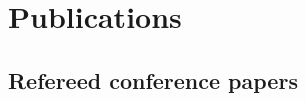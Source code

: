 
\section{Publications}

\subsection{Refereed conference papers}

\nocite{Rivera-Rubio2010}
\nocite{Madera2009}
\nocite{Rivera-Rubio2009}

\printbibliography





%
%
%


